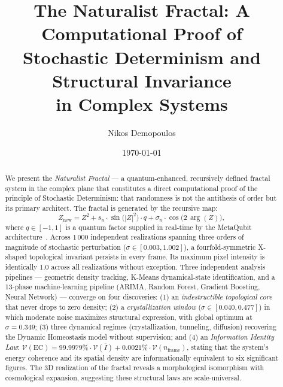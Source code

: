 \documentclass[twocolumn,amsmath,amssymb,prl]{revtex4-2}
\begin{document}
\title{The Naturalist Fractal: A Computational Proof of\\
       Stochastic Determinism and Structural Invariance\\
       in Complex Systems}

\author{Nikos Demopoulos}

\date{\today}

\begin{abstract}
We present the \emph{Naturalist Fractal} — a quantum-enhanced, recursively
defined fractal system in the complex plane that constitutes a direct
computational proof of the principle of Stochastic Determinism: that
randomness is not the antithesis of order but its primary architect.  The
fractal is generated by the recursive map:
\[
  Z_{\text{new}} = Z^2 + s_n \cdot \sin\!\bigl(|Z|^2\bigr) \cdot q
                       + \sigma_n \cdot \cos\!\bigl(2\,\arg(Z)\bigr),
\]
where $q \in [-1,1]$ is a quantum factor supplied in real-time by the
MetaQubit architecture~\cite{DemopoulosMetaQubit}.  Across 1\,000 independent
realizations spanning three orders of magnitude of stochastic perturbation
($\sigma \in [0.003, 1.002]$), a fourfold-symmetric X-shaped topological
invariant persists in every frame.  Its maximum pixel intensity is identically
1.0 across all realizations without exception.  Three independent analysis
pipelines — geometric density tracking, K-Means dynamical-state
identification, and a 13-phase machine-learning pipeline (ARIMA, Random
Forest, Gradient Boosting, Neural Network) — converge on four discoveries:
(1) an \emph{indestructible topological core} that never drops to zero
density; (2) a \emph{crystallization window} ($\sigma \in [0.040, 0.477]$)
in which moderate noise maximizes structural expression, with global optimum
at $\sigma = 0.349$; (3) three dynamical regimes (crystallization, tunneling,
diffusion) recovering the Dynamic Homeostasis model without supervision; and
(4) an \emph{Information Identity Law}:
$\mathcal{V}(\text{EC}) = 99.9979\%\cdot\mathcal{V}(\overline{I}) +
0.0021\%\cdot\mathcal{V}(n_{\text{frame}})$,
stating that the system's energy coherence and its spatial density are
informationally equivalent to six significant figures.  The 3D realization
of the fractal reveals a morphological isomorphism with cosmological
expansion, suggesting these structural laws are scale-universal.
\end{abstract}
\end{document}

